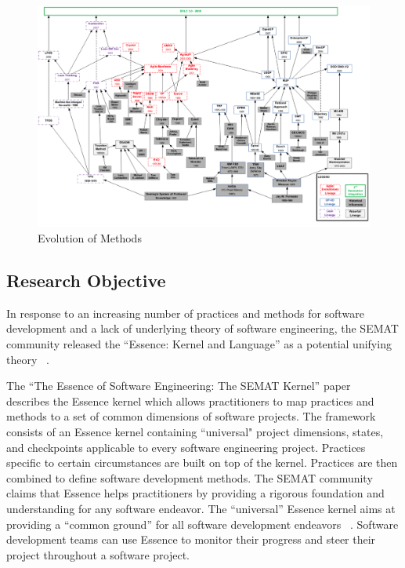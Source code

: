 \documentclass[preprint,12pt,3p]{elsarticle}
\begin{document}
\begin{figure}[h]\vspace*{4pt}
\centerline{\includegraphics[width=5.4in]{field_study_images/EvolutionOfMethods}}
\caption{Evolution of Methods}\vspace*{-6pt}\label{EvolutionOfMethods}
\end{figure}

\subsection{Research Objective}
In response to an increasing number of practices and methods for software development and a lack of underlying theory of software engineering, the SEMAT community released the “Essence: Kernel and Language” as a potential unifying theory  ~\cite{OMGStandard}.

The ``The Essence of Software Engineering: The SEMAT Kernel'' paper ~\cite{JacobsonQueue} describes the Essence kernel which allows practitioners to map practices and methods to a set of common dimensions of software projects. The framework consists of an Essence kernel containing ``universal" project dimensions, states, and checkpoints applicable to every software engineering project. Practices specific to certain circumstances are built on top of the kernel. Practices are then combined to define software development methods. The SEMAT community claims that Essence helps practitioners by providing a rigorous foundation and understanding for any software endeavor. The “universal” Essence kernel aims at providing a “common ground” for all software development endeavors ~\cite{JacobsonQueue}. Software development teams can use Essence to monitor their progress and steer their project throughout a software project. 
\end{document}
